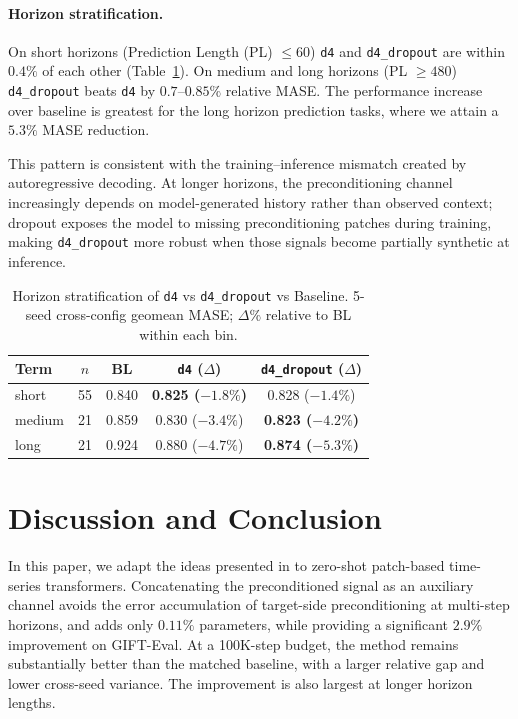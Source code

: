 \documentclass{article}
\begin{document}
\paragraph{Horizon stratification.} On short horizons (Prediction Length (PL) $\leq 60$) \texttt{d4} and \texttt{d4\_dropout} are within $0.4\%$ of each other (Table~\ref{tab:horizon-main}). On medium and long horizons (PL $\geq 480$) \texttt{d4\_dropout} beats \texttt{d4} by $0.7$--$0.85\%$ relative MASE. The performance increase over baseline is greatest for the long horizon prediction tasks, where we attain a $5.3\%$ MASE reduction. 

This pattern is consistent with the training--inference mismatch created by autoregressive decoding. At longer horizons, the preconditioning channel increasingly depends on model-generated history rather than observed context; dropout exposes the model to missing preconditioning patches during training, making \texttt{d4\_dropout} more robust when those signals become partially synthetic at inference.

\begin{table}[t]
\caption{Horizon stratification of \texttt{d4} vs \texttt{d4\_dropout} vs Baseline. 5-seed cross-config geomean MASE; $\Delta\%$ relative to BL within each bin.}
\label{tab:horizon-main}
\vskip 0.06in
\centering
\begin{small}
\setlength{\tabcolsep}{3pt}
\begin{tabular}{lcccc}
\toprule
\textbf{Term} & \textbf{$n$} & \textbf{BL} & \texttt{d4} \textbf{($\Delta$)} & \texttt{d4\_dropout} \textbf{($\Delta$)} \\
\midrule
short  & 55 & 0.840 & \textbf{0.825 ($-1.8\%$)} & 0.828 ($-1.4\%$) \\
medium & 21 & 0.859 & 0.830 ($-3.4\%$) & \textbf{0.823 ($-4.2\%$)} \\
long   & 21 & 0.924 & 0.880 ($-4.7\%$) & \textbf{0.874 ($-5.3\%$)} \\
\bottomrule
\end{tabular}
\end{small}
\vskip -0.15in
\end{table}

\section{Discussion and Conclusion}
In this paper, we adapt the ideas presented in \citet{marsden2024universal} to zero-shot patch-based time-series transformers. Concatenating the preconditioned signal as an auxiliary channel avoids the error accumulation of target-side preconditioning at multi-step horizons, and adds only $0.11\%$ parameters, while providing a significant $2.9\%$ improvement on GIFT-Eval. At a 100K-step budget, the method remains substantially better than the matched baseline, with a larger relative gap and lower cross-seed variance. The improvement is also largest at longer horizon lengths.
\end{document}
